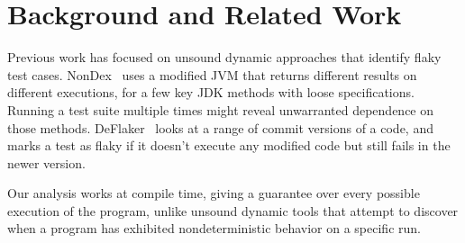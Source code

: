 \section{Background and Related Work\label{sec:related}}
Previous work has focused on unsound dynamic
approaches that identify flaky test cases.
NonDex~\cite{ShiGLM2016} uses a modified JVM that returns different results on different
executions, for a few key JDK methods with loose specifications.  Running a
test suite multiple times might reveal unwarranted dependence on those
methods.
DeFlaker~\cite{BellLHEYM2018} looks at a range of commit versions
of a code, and marks a test as flaky if it doesn't execute any modified
code but still fails in the newer version.

Our analysis works at compile time, giving a guarantee over every possible
execution of the program, unlike unsound dynamic tools that attempt
to discover when a program has exhibited nondeterministic behavior on a
specific run.  


